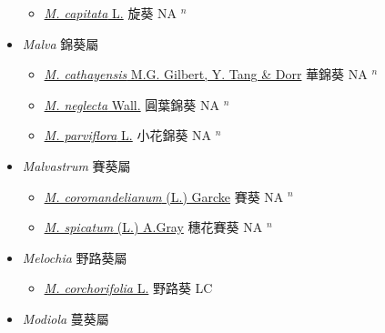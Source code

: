 \begin{itemize}
  \begin{itemize}
        \item[] \href{http://www.theplantlist.org/tpl1.1/search?q=Malachra+capitata}{\textit{M. capitata} L.}   旋葵 NA $^n$
  \end{itemize}
 \item[] \textit{Malva} 錦葵屬
                    
  \begin{itemize}
        \item[] \href{http://www.theplantlist.org/tpl1.1/search?q=Malva+cathayensis}{\textit{M. cathayensis} M.G. Gilbert, Y. Tang \& Dorr}   華錦葵 NA $^n$
        \item[] \href{http://www.theplantlist.org/tpl1.1/search?q=Malva+neglecta}{\textit{M. neglecta} Wall.}   圓葉錦葵 NA $^n$
        \item[] \href{http://www.theplantlist.org/tpl1.1/search?q=Malva+parviflora}{\textit{M. parviflora} L.}   小花錦葵 NA $^n$
  \end{itemize}
 \item[] \textit{Malvastrum} 賽葵屬
                    
  \begin{itemize}
        \item[] \href{http://www.theplantlist.org/tpl1.1/search?q=Malvastrum+coromandelianum}{\textit{M. coromandelianum} (L.) Garcke}   賽葵 NA $^n$
        \item[] \href{http://www.theplantlist.org/tpl1.1/search?q=Malvastrum+spicatum}{\textit{M. spicatum} (L.) A.Gray}   穗花賽葵 NA $^n$
  \end{itemize}
 \item[] \textit{Melochia} 野路葵屬
                    
  \begin{itemize}
        \item[] \href{http://www.theplantlist.org/tpl1.1/search?q=Melochia+corchorifolia}{\textit{M. corchorifolia} L.}   野路葵 LC
  \end{itemize}
 \item[] \textit{Modiola} 蔓葵屬
                    

\end{itemize}
